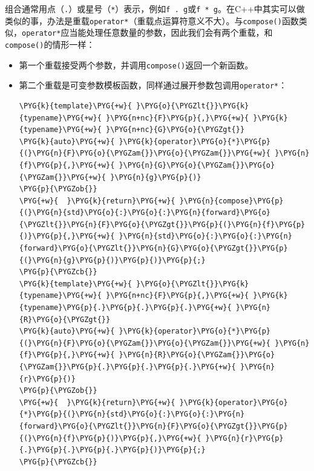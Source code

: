 
组合通常用点（\texttt{.}）或星号（\texttt{*}）表示，例如\texttt{f . g}或\texttt{f * g}。在C++中其实可以做类似的事，办法是重载\texttt{operator*}（重载点运算符意义不大）。与\texttt{compose()}函数类似，\texttt{operator*}应当能处理任意数量的参数，因此我们会有两个重载，和\texttt{compose()}的情形一样：



\begin{itemize}
\item 第一个重载接受两个参数，并调用\texttt{compose()}返回一个新函数。



\item 第二个重载是可变参数模板函数，同样通过展开参数包调用\texttt{operator*}：



\begin{codeblockbg}
\begin{Verbatim}[commandchars=\\\{\},breaklines=true,breakanywhere=true,fontsize=\codefont,xleftmargin=17bp]
\PYG{k}{template}\PYG{+w}{ }\PYG{o}{\PYGZlt{}}\PYG{k}{typename}\PYG{+w}{ }\PYG{n+nc}{F}\PYG{p}{,}\PYG{+w}{ }\PYG{k}{typename}\PYG{+w}{ }\PYG{n+nc}{G}\PYG{o}{\PYGZgt{}}
\PYG{k}{auto}\PYG{+w}{ }\PYG{k}{operator}\PYG{o}{*}\PYG{p}{(}\PYG{n}{F}\PYG{o}{\PYGZam{}}\PYG{o}{\PYGZam{}}\PYG{+w}{ }\PYG{n}{f}\PYG{p}{,}\PYG{+w}{ }\PYG{n}{G}\PYG{o}{\PYGZam{}}\PYG{o}{\PYGZam{}}\PYG{+w}{ }\PYG{n}{g}\PYG{p}{)}
\PYG{p}{\PYGZob{}}
\PYG{+w}{  }\PYG{k}{return}\PYG{+w}{ }\PYG{n}{compose}\PYG{p}{(}\PYG{n}{std}\PYG{o}{:}\PYG{o}{:}\PYG{n}{forward}\PYG{o}{\PYGZlt{}}\PYG{n}{F}\PYG{o}{\PYGZgt{}}\PYG{p}{(}\PYG{n}{f}\PYG{p}{)}\PYG{p}{,}\PYG{+w}{ }\PYG{n}{std}\PYG{o}{:}\PYG{o}{:}\PYG{n}{forward}\PYG{o}{\PYGZlt{}}\PYG{n}{G}\PYG{o}{\PYGZgt{}}\PYG{p}{(}\PYG{n}{g}\PYG{p}{)}\PYG{p}{)}\PYG{p}{;}
\PYG{p}{\PYGZcb{}}
\PYG{k}{template}\PYG{+w}{ }\PYG{o}{\PYGZlt{}}\PYG{k}{typename}\PYG{+w}{ }\PYG{n+nc}{F}\PYG{p}{,}\PYG{+w}{ }\PYG{k}{typename}\PYG{p}{.}\PYG{p}{.}\PYG{p}{.}\PYG{+w}{ }\PYG{n}{R}\PYG{o}{\PYGZgt{}}
\PYG{k}{auto}\PYG{+w}{ }\PYG{k}{operator}\PYG{o}{*}\PYG{p}{(}\PYG{n}{F}\PYG{o}{\PYGZam{}}\PYG{o}{\PYGZam{}}\PYG{+w}{ }\PYG{n}{f}\PYG{p}{,}\PYG{+w}{ }\PYG{n}{R}\PYG{o}{\PYGZam{}}\PYG{o}{\PYGZam{}}\PYG{p}{.}\PYG{p}{.}\PYG{p}{.}\PYG{+w}{ }\PYG{n}{r}\PYG{p}{)}
\PYG{p}{\PYGZob{}}
\PYG{+w}{  }\PYG{k}{return}\PYG{+w}{ }\PYG{k}{operator}\PYG{o}{*}\PYG{p}{(}\PYG{n}{std}\PYG{o}{:}\PYG{o}{:}\PYG{n}{forward}\PYG{o}{\PYGZlt{}}\PYG{n}{F}\PYG{o}{\PYGZgt{}}\PYG{p}{(}\PYG{n}{f}\PYG{p}{)}\PYG{p}{,}\PYG{+w}{ }\PYG{n}{r}\PYG{p}{.}\PYG{p}{.}\PYG{p}{.}\PYG{p}{)}\PYG{p}{;}
\PYG{p}{\PYGZcb{}}
\end{Verbatim}
\end{codeblockbg}

\end{itemize}



